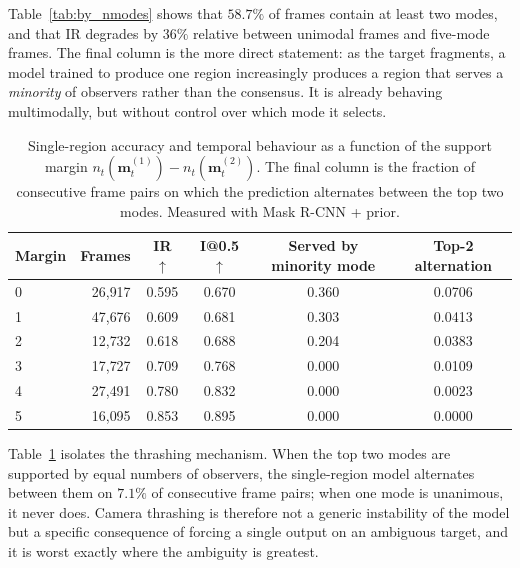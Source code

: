 \documentclass[preprint,12pt]{elsarticle}
\begin{document}
Table~\ref{tab:by_nmodes} shows that $58.7\%$ of frames contain at least two
modes, and that IR degrades by $36\%$ relative between unimodal frames and
five-mode frames. The final column is the more direct statement: as the target
fragments, a model trained to produce one region increasingly produces a region
that serves a \emph{minority} of observers rather than the consensus. It is
already behaving multimodally, but without control over which mode it selects.

\begin{table}[t]
  \centering
  \caption{Single-region accuracy and temporal behaviour as a function of the
  support margin $n_t(\mathbf{m}^{(1)}_t) - n_t(\mathbf{m}^{(2)}_t)$. The final
  column is the fraction of consecutive frame pairs on which the prediction
  alternates between the top two modes. Measured with Mask R-CNN + prior.}
  \label{tab:by_margin}
  \begin{tabular}{lrcccc}
    \toprule
    Margin & Frames & IR $\uparrow$ & I@0.5 $\uparrow$
      & Served by minority mode & Top-2 alternation \\
    \midrule
    0 & 26{,}917 & 0.595 & 0.670 & 0.360 & 0.0706 \\
    1 & 47{,}676 & 0.609 & 0.681 & 0.303 & 0.0413 \\
    2 & 12{,}732 & 0.618 & 0.688 & 0.204 & 0.0383 \\
    3 & 17{,}727 & 0.709 & 0.768 & 0.000 & 0.0109 \\
    4 & 27{,}491 & 0.780 & 0.832 & 0.000 & 0.0023 \\
    5 & 16{,}095 & 0.853 & 0.895 & 0.000 & 0.0000 \\
    \bottomrule
  \end{tabular}
\end{table}

Table~\ref{tab:by_margin} isolates the thrashing mechanism. When the top two
modes are supported by equal numbers of observers, the single-region model
alternates between them on $7.1\%$ of consecutive frame pairs; when one mode is
unanimous, it never does. Camera thrashing is therefore not a generic
instability of the model but a specific consequence of forcing a single output
on an ambiguous target, and it is worst exactly where the ambiguity is
greatest.
\end{document}
